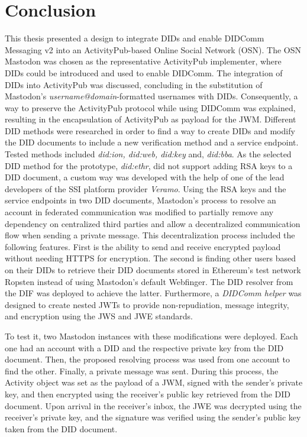 \chapter{Conclusion}
\label{cha:conclusion}

This thesis presented a design to integrate DIDs and enable DIDComm Messaging v2 into an ActivityPub-based Online Social Network (OSN). The OSN Mastodon was chosen as the representative ActivityPub implementer, where DIDs could be introduced and used to enable DIDComm. 
 The integration of DIDs into ActivityPub was discussed, concluding in the substitution of Mastodon's \emph{username@domain}-formatted usernames with DIDs. Consequently, a way to preserve the ActivityPub protocol while using DIDComm was explained, resulting in the encapsulation of ActivityPub as payload for the JWM. 
Different DID methods were researched in order to find a way to create DIDs and modify the DID documents to include a new verification method and a service endpoint. Tested methods included \emph{did:ion, did:web, did:key} and, \emph{did:bba}. As the selected DID method for the prototype, \emph{did:ethr}, did not support adding RSA keys to a DID document, a custom way was developed with the help of one of the lead developers of the SSI platform provider \emph{Veramo}.
Using the RSA keys and the service endpoints in two DID documents, Mastodon's process to resolve an account in federated communication was modified to partially remove any dependency on centralized third parties and allow a decentralized communication flow when sending a private message. This decentralization process included the following features. First is the ability to send and receive encrypted payload without needing HTTPS for encryption. The second is finding other users based on their DIDs to retrieve their DID documents stored in Ethereum's test network Ropsten instead of using Mastodon's default Webfinger. The DID resolver from the DIF was deployed to achieve the latter. Furthermore, a \emph{DIDComm helper} was designed to create nested JWTs to provide non-repudiation, message integrity, and encryption using the JWS and JWE standards.


To test it, two Mastodon instances with these modifications were deployed. Each one had an account with a DID and the respective private key from the DID document. Then, the proposed resolving process was used from one account to find the other. Finally, a private message was sent. During this process, the Activity object was set as the payload of a JWM, signed with the sender's private key, and then encrypted using the receiver's public key retrieved from the DID document. Upon arrival in the receiver's inbox, the JWE was decrypted using the receiver's private key, and the signature was verified using the sender's public key taken from the DID document.




